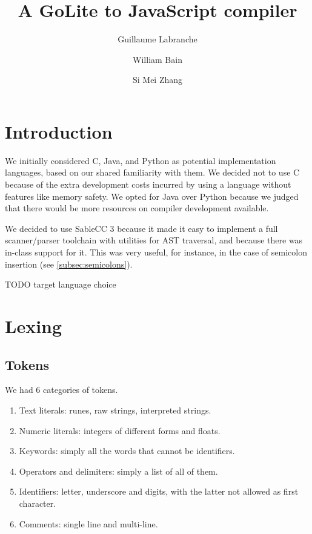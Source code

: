 \documentclass[oneside]{article}
\begin{document}
\title{A GoLite to JavaScript compiler}
\author{Guillaume Labranche \and William Bain \and Si Mei Zhang}
\maketitle

\tableofcontents

\section{Introduction}

We initially considered C, Java, and Python as potential implementation languages, based on our shared familiarity with them. We decided not to use C because of the extra development costs incurred by using a language without features like memory safety. We opted for Java over Python because we judged that there would be more resources on compiler development available.

We decided to use SableCC 3 because it made it easy to implement a full scanner/parser toolchain with utilities for AST traversal, and because there was in-class support for it. This was very useful, for instance, in the case of semicolon insertion (see \ref{subsec:semicolons}).

TODO target language choice

\section{Lexing}

\subsection{Tokens}
We had 6 categories of tokens.
\begin{enumerate}
\item Text literals: runes, raw strings, interpreted strings.
\item Numeric literals: integers of different forms and floats.
\item Keywords: simply all the words that cannot be identifiers.
\item Operators and delimiters: simply a list of all of them.
\item Identifiers: letter, underscore and digits, with the latter not allowed as first character.
\item Comments: single line and multi-line.
\end{enumerate}
\end{document}
